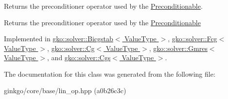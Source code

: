 Returns the preconditioner operator used by the \hyperlink{classgko_1_1Preconditionable}{Preconditionable}. 

\begin{DoxyReturn}{Returns}
the preconditioner operator used by the \hyperlink{classgko_1_1Preconditionable}{Preconditionable} 
\end{DoxyReturn}


Implemented in \hyperlink{classgko_1_1solver_1_1Bicgstab_ac16d32672fbc91d8cfd7c0607c9771db}{gko\+::solver\+::\+Bicgstab$<$ Value\+Type $>$}, \hyperlink{classgko_1_1solver_1_1Fcg_a2dec8d13548e8b316d6598c9ee8b0881}{gko\+::solver\+::\+Fcg$<$ Value\+Type $>$}, \hyperlink{classgko_1_1solver_1_1Cg_a797544ecc8d86d2798014e7f5f5baf4f}{gko\+::solver\+::\+Cg$<$ Value\+Type $>$}, \hyperlink{classgko_1_1solver_1_1Gmres_ac2e3e0024a37647eda9f8a7f5b4cefb4}{gko\+::solver\+::\+Gmres$<$ Value\+Type $>$}, and \hyperlink{classgko_1_1solver_1_1Cgs_ad349dc1381dfdcb7a47223908806dcc7}{gko\+::solver\+::\+Cgs$<$ Value\+Type $>$}.



The documentation for this class was generated from the following file\+:\begin{DoxyCompactItemize}
\item 
ginkgo/core/base/lin\+\_\+op.\+hpp (a0b26c3c)\end{DoxyCompactItemize}
